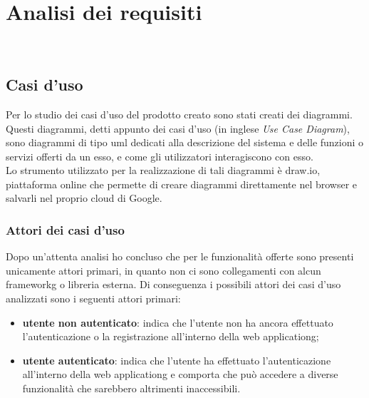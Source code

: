 
\chapter{Analisi dei requisiti}
\label{cap:analisi-requisiti}

\\

\section{Casi d'uso}
\label{sec:casi-uso}

Per lo studio dei casi d'uso del prodotto creato sono stati creati dei diagrammi.
Questi diagrammi, detti appunto dei casi d'uso (in inglese \emph{Use Case Diagram}), sono diagrammi di tipo \gls{uml} dedicati alla descrizione del sistema e delle funzioni o servizi offerti da un esso, e come gli utilizzatori interagiscono con esso.\\
Lo strumento utilizzato per la realizzazione di tali diagrammi è draw.io, piattaforma online che permette di creare diagrammi direttamente nel browser e salvarli nel proprio cloud di Google.

\subsection{Attori dei casi d'uso}
\label{subsec:attori}

Dopo un'attenta analisi ho concluso che per le funzionalità offerte sono presenti unicamente attori primari, in quanto non ci sono collegamenti con alcun \gls{frameworkg} o libreria esterna.
Di conseguenza i possibili attori dei casi d'uso analizzati sono i seguenti attori primari:
\begin{itemize}
	\item \textbf{utente non autenticato}: indica che l'utente non ha ancora effettuato l'autenticazione o la registrazione all'interno della \gls{web applicationg};
	\item \textbf{utente autenticato}: indica che l'utente ha effettuato l'autenticazione all'interno della \gls{web applicationg} e comporta che può accedere a diverse funzionalità che sarebbero altrimenti inaccessibili.
\end{itemize}

